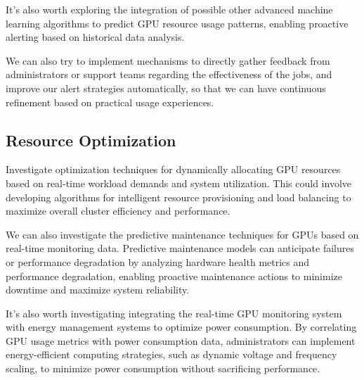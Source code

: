 It's also worth exploring the integration of possible other advanced machine learning algorithms to predict GPU resource usage patterns, enabling proactive alerting based on historical data analysis.

We can also try to implement mechanisms to directly gather feedback from administrators or support teams regarding the effectiveness of the jobs, and improve our alert strategies automatically, so that we can have continuous refinement based on practical usage experiences.

\subsection{Resource Optimization}
Investigate optimization techniques for dynamically allocating GPU resources based on real-time workload demands and system utilization. This could involve developing algorithms for intelligent resource provisioning and load balancing to maximize overall cluster efficiency and performance.

We can also investigate the predictive maintenance techniques for GPUs based on real-time monitoring data. Predictive maintenance models can anticipate failures or performance degradation by analyzing hardware health metrics and performance degradation, enabling proactive maintenance actions to minimize downtime and maximize system reliability.

It's also worth investigating integrating the real-time GPU monitoring system with energy management systems to optimize power consumption. By correlating GPU usage metrics with power consumption data, administrators can implement energy-efficient computing strategies, such as dynamic voltage and frequency scaling, to minimize power consumption without sacrificing performance.
